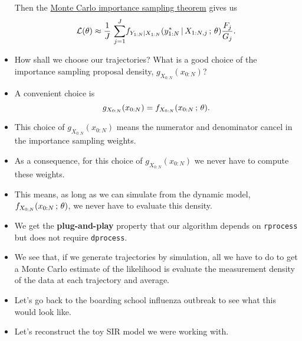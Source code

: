 \documentclass[]{article}
\begin{document}
\begin{itemize}
  Then the \href{monteCarlo.html\#importance-sampling}{Monte Carlo
  importance sampling theorem} gives us
  \[\mathcal{L}(\theta) \approx \frac{1}{J}\,\sum_{j=1}^{J}\!
  f_{Y_{1:N}|X_{1:N}}(y_{1:N}^*{\, | \,} X_{1:N,j}\, ; \,\theta)
  \frac{F_j}{G_j}.\]
\item
  How shall we choose our trajectories? What is a good choice of the
  importance sampling proposal density, \(g_{X_{0:N}}(x_{0:N})\)?
\item
  A convenient choice is
  \[ g_{X_{0:N}}(x_{0:N}) = f_{X_{0:N}}(x_{0:N}\, ; \,\theta).\]
\item
  This choice of \(g_{X_{0:N}}(x_{0:N})\) means the numerator and
  denominator cancel in the importance sampling weights.
\item
  As a consequence, for this choice of \(g_{X_{0:N}}(x_{0:N})\) we never
  have to compute these weights.
\item
  This means, as long as we can simulate from the dynamic model,
  \(f_{X_{0:N}}(x_{0:N}\, ; \,\theta)\), we never have to evaluate this
  density.
\item
  We get the \textbf{plug-and-play} property that our algorithm depends
  on \texttt{rprocess} but does not require \texttt{dprocess}.
\item
  We see that, if we generate trajectories by simulation, all we have to
  do to get a Monte Carlo estimate of the likelihood is evaluate the
  measurement density of the data at each trajectory and average.
\item
  Let's go back to the boarding school influenza outbreak to see what
  this would look like.
\item
  Let's reconstruct the toy SIR model we were working with.
\end{itemize}
\end{document}
